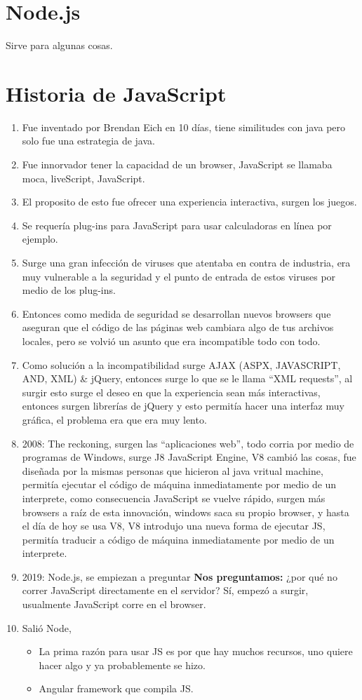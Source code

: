\section{Node.js}
Sirve para algunas cosas.
\section{Historia de JavaScript}
\begin{enumerate}
    \item Fue inventado por Brendan Eich en 10 días, tiene similitudes con java pero solo fue una estrategia de java.
    \item Fue innorvador tener la capacidad de un  browser, JavaScript se llamaba moca, liveScript, JavaScript.
    \item El proposito de esto fue ofrecer una experiencia interactiva, surgen los juegos.
    \item Se requería plug-ins para JavaScript para usar calculadoras en línea por ejemplo.
    \item Surge una gran infección de viruses que atentaba en contra de industria, era muy vulnerable a la seguridad y el punto de entrada de estos viruses por medio de los plug-ins.
    \item Entonces como medida de seguridad se desarrollan nuevos browsers que aseguran que el código de las páginas web cambiara algo de tus archivos locales, pero se volvió un asunto que era incompatible todo con todo.
    \item Como solución a la incompatibilidad surge AJAX (ASPX, JAVASCRIPT, AND, XML) \& jQuery, entonces surge lo que se le llama ``XML requests'', al surgir esto surge el deseo en que la experiencia sean más interactivas, entonces surgen librerías de jQuery y esto permitía hacer una interfaz muy gráfica, el problema era que era muy lento.
    \item 2008: The reckoning, surgen las ``aplicaciones web'', todo corria por medio de programas de Windows, surge J8 JavaScript  Engine, V8 cambió las cosas, fue diseñada por la mismas personas que hicieron al java vritual machine, permitía ejecutar el código de máquina inmediatamente por medio de un interprete, como consecuencia JavaScript se vuelve rápido, surgen más browsers a raíz de esta innovación, windows saca su propio browser, y hasta el día de hoy se usa V8, V8 introdujo una nueva forma de ejecutar JS, permitía traducir a código de máquina inmediatamente por medio de un interprete.
    \item 2019: Node.js, se empiezan a preguntar \textbf{Nos preguntamos:} ¿por qué no correr JavaScript directamente en el servidor? Sí, empezó a surgir, usualmente JavaScript corre en el browser.
    \item Salió Node, 
        \begin{itemize}
            \item La prima razón para usar JS es por que hay muchos recursos, uno quiere hacer algo y ya probablemente se hizo.
            \item Angular framework que compila JS.
        \end{itemize}
    

\end{enumerate}
